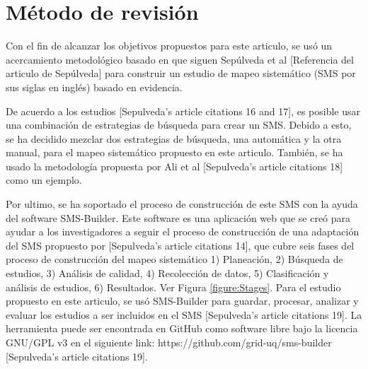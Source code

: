 \section{Método de revisión}
Con el fin de alcanzar los objetivos propuestos para este articulo, se usó un acercamiento metodológico basado en que siguen Sepúlveda et al [Referencia del articulo de Sepúlveda] para construir un estudio de mapeo sistemático (SMS por sus siglas en inglés) basado en evidencia.

De acuerdo a los estudios [Sepulveda's article citations 16 and 17], es posible usar una combinación de estrategias de búsqueda para crear un SMS. Debido a esto, se ha decidido mezclar dos estrategias de búsqueda, una automática y la otra manual, para el mapeo sistemático propuesto en este articulo. También, se ha usado la metodología propuesta por Ali et al [Sepulveda's article citations 18] como un ejemplo.

Por ultimo, se ha soportado el proceso de construcción de este SMS con la ayuda del software SMS-Builder. Este software es una aplicación web que se creó para ayudar a los investigadores a seguir el proceso de construcción de una adaptación del SMS propuesto por [Sepulveda's article citations 14], que cubre seis fases del proceso de construcción del mapeo sistemático 1) Planeación, 2) Búsqueda de estudios, 3) Análisis de calidad, 4) Recolección de datos, 5) Clasificación y análisis de estudios, 6) Resultados. Ver Figura \ref{figure:Stages}. Para el estudio propuesto en este articulo, se usó SMS-Builder para guardar, procesar, analizar y evaluar los estudios a ser incluidos en el SMS [Sepulveda's article citations 19]. La herramienta puede ser encontrada en GitHub como software libre bajo la licencia GNU/GPL v3 en el siguiente link: https://github.com/grid-uq/sms-builder [Sepulveda's article citations 19].

